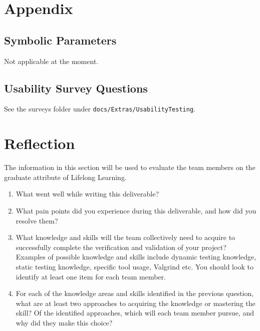 \documentclass[12pt, titlepage]{article}
\begin{document}
  \begin{appendices}

    \section{Appendix}


    \subsection{Symbolic Parameters}

    Not applicable at the moment.

    \subsection{Usability Survey Questions} \label{A.2}

    See the surveys folder under \texttt{docs/Extras/UsabilityTesting}.

    \newpage{}
    \section{Reflection}


    The information in this section will be used to evaluate the team
    members on the
    graduate attribute of Lifelong Learning.

    

    \begin{enumerate}
      \item What went well while writing this deliverable?
      \item What pain points did you experience during this deliverable, and how
        did you resolve them?
      \item What knowledge and skills will the team collectively need
        to acquire to
        successfully complete the verification and validation of your project?
        Examples of possible knowledge and skills include dynamic
        testing knowledge,
        static testing knowledge, specific tool usage, Valgrind etc.
        You should look to
        identify at least one item for each team member.
      \item For each of the knowledge areas and skills identified in
        the previous
        question, what are at least two approaches to acquiring the knowledge or
        mastering the skill?  Of the identified approaches, which will each team
        member pursue, and why did they make this choice?
    \end{enumerate}


\end{appendices}
\end{document}
